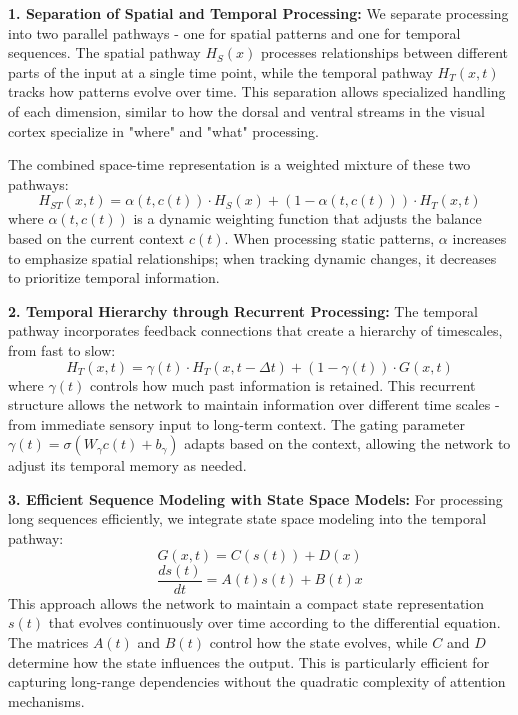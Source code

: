 \documentclass{article}
\begin{document}
\textbf{1. Separation of Spatial and Temporal Processing:}
We separate processing into two parallel pathways - one for spatial patterns and one for temporal sequences. The spatial pathway $H_S(x)$ processes relationships between different parts of the input at a single time point, while the temporal pathway $H_T(x, t)$ tracks how patterns evolve over time. This separation allows specialized handling of each dimension, similar to how the dorsal and ventral streams in the visual cortex specialize in "where" and "what" processing.

The combined space-time representation is a weighted mixture of these two pathways:
\begin{equation}
H_{ST}(x, t) = \alpha(t, c(t)) \cdot H_S(x) + (1 - \alpha(t, c(t))) \cdot H_T(x, t)
\end{equation}
where $\alpha(t, c(t))$ is a dynamic weighting function that adjusts the balance based on the current context $c(t)$. When processing static patterns, $\alpha$ increases to emphasize spatial relationships; when tracking dynamic changes, it decreases to prioritize temporal information.

\textbf{2. Temporal Hierarchy through Recurrent Processing:}
The temporal pathway incorporates feedback connections that create a hierarchy of timescales, from fast to slow:
\begin{equation}
H_T(x, t) = \gamma(t) \cdot H_T(x, t-\Delta t) + (1-\gamma(t)) \cdot G(x, t)
\end{equation}
where $\gamma(t)$ controls how much past information is retained. This recurrent structure allows the network to maintain information over different time scales - from immediate sensory input to long-term context. The gating parameter $\gamma(t) = \sigma(W_\gamma c(t) + b_\gamma)$ adapts based on the context, allowing the network to adjust its temporal memory as needed.

\textbf{3. Efficient Sequence Modeling with State Space Models:}
For processing long sequences efficiently, we integrate state space modeling into the temporal pathway:
\begin{equation}
G(x, t) = C(s(t)) + D(x)
\end{equation}
\begin{equation}
\frac{ds(t)}{dt} = A(t)s(t) + B(t)x
\end{equation}
This approach allows the network to maintain a compact state representation $s(t)$ that evolves continuously over time according to the differential equation. The matrices $A(t)$ and $B(t)$ control how the state evolves, while $C$ and $D$ determine how the state influences the output. This is particularly efficient for capturing long-range dependencies without the quadratic complexity of attention mechanisms.
\end{document}
